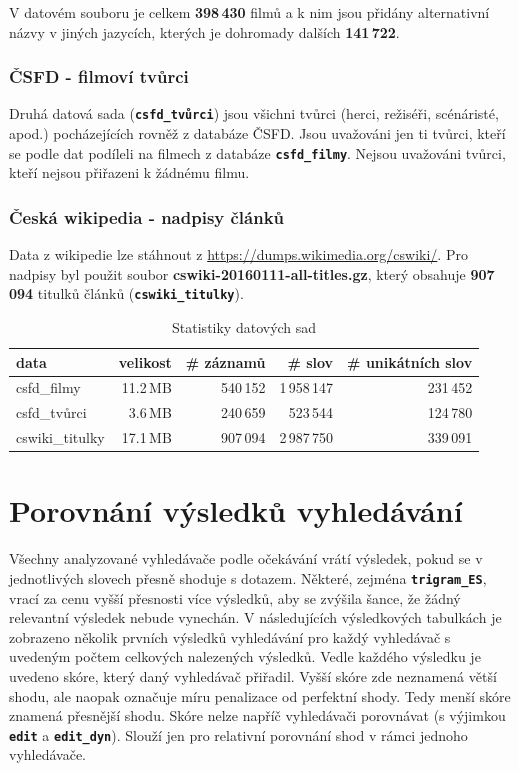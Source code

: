 \documentclass[11pt,letterpaper,oneside,openright]{book}
\newcommand{\bftt}[1]{\texttt{\textbf{#1}}}
\begin{document}
V datovém souboru je celkem \textbf{398\,430} filmů a k nim jsou přidány
alternativní názvy v jiných jazycích, kterých je dohromady dalších
\textbf{141\,722}.

\subsubsection{ČSFD - filmoví tvůrci}
Druhá datová sada (\bftt{csfd\_tvůrci}) jsou všichni tvůrci (herci, režiséři,
scénáristé, apod.) pocházejících rovněž z databáze ČSFD. Jsou uvažováni jen ti
tvůrci, kteří se podle dat podíleli na filmech z databáze \bftt{csfd\_filmy}.
Nejsou uvažováni tvůrci, kteří nejsou přiřazeni k žádnému filmu.

\subsubsection{Česká wikipedia - nadpisy článků}
Data z wikipedie lze stáhnout z \url{https://dumps.wikimedia.org/cswiki/}. Pro
nadpisy byl použit soubor \textbf{cswiki-20160111-all-titles.gz}, který
obsahuje \textbf{907\,094} titulků článků (\bftt{cswiki\_titulky}).


\mbox{}
\begin{tt}
\begin{table}[H]
\centering
\begin{tabulary}{\textwidth}{LRRRR}
\textbf{data} & \textbf{velikost} & \textbf{\# záznamů} & \textbf{\# slov} & \textbf{\# unikátních slov} \\
\hline
csfd\_filmy     & 11.2\,MB & 540\,152 & 1\,958\,147 & 231\,452 \\
csfd\_tvůrci    & 3.6\,MB  & 240\,659 & 523\,544    & 124\,780 \\
cswiki\_titulky & 17.1\,MB & 907\,094 & 2\,987\,750 & 339\,091 \\
\hline
\end{tabulary}
\caption{Statistiky datových sad}
\label{tab:data_stats}
\end{table}
\end{tt}

\section{Porovnání výsledků vyhledávání}
Všechny analyzované vyhledávače podle očekávání vrátí výsledek, pokud se v
jednotlivých slovech přesně shoduje s dotazem. Některé, zejména
\bftt{trigram\_ES}, vrací za cenu vyšší přesnosti více výsledků, aby se zvýšila
šance, že žádný relevantní výsledek nebude vynechán.  V následujících
výsledkových tabulkách je zobrazeno několik prvních výsledků vyhledávání pro
každý vyhledávač s uvedeným počtem celkových nalezených výsledků. Vedle každého
výsledku je uvedeno skóre, který daný vyhledávač přiřadil. Vyšší skóre zde
neznamená větší shodu, ale naopak označuje míru penalizace od perfektní shody.
Tedy menší skóre znamená přesnější shodu. Skóre nelze napříč vyhledávači
porovnávat (s výjimkou \bftt{edit} a \bftt{edit\_dyn}). Slouží jen pro
relativní porovnání shod v rámci jednoho vyhledávače.
\end{document}
